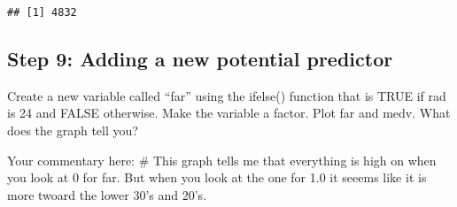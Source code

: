 \documentclass[
]{article}
\newenvironment{Shaded}{\begin{snugshade}}{\end{snugshade}}
\newcommand{\CommentTok}[1]{\textcolor[rgb]{0.56,0.35,0.01}{\textit{#1}}}
\newcommand{\ConstantTok}[1]{\textcolor[rgb]{0.00,0.00,0.00}{#1}}
\newcommand{\DecValTok}[1]{\textcolor[rgb]{0.00,0.00,0.81}{#1}}
\newcommand{\FunctionTok}[1]{\textcolor[rgb]{0.00,0.00,0.00}{#1}}
\newcommand{\NormalTok}[1]{#1}
\newcommand{\OtherTok}[1]{\textcolor[rgb]{0.56,0.35,0.01}{#1}}
\newcommand{\SpecialCharTok}[1]{\textcolor[rgb]{0.00,0.00,0.00}{#1}}
\begin{document}
\begin{verbatim}
## [1] 4832
\end{verbatim}

\hypertarget{step-9-adding-a-new-potential-predictor}{%
\subsection{Step 9: Adding a new potential
predictor}\label{step-9-adding-a-new-potential-predictor}}

Create a new variable called ``far'' using the ifelse() function that is
TRUE if rad is 24 and FALSE otherwise. Make the variable a factor. Plot
far and medv. What does the graph tell you?

Your commentary here: \# This graph tells me that everything is high on
when you look at 0 for far. But when you look at the one for 1.0 it
seeems like it is more twoard the lower 30's and 20's.

\begin{Shaded}
\end{Shaded}
\end{document}
